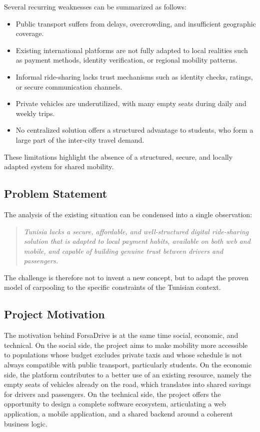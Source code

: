Several recurring weaknesses can be summarized as follows:

\begin{itemize}[noitemsep]
    \item Public transport suffers from delays, overcrowding, and insufficient geographic coverage.
    \item Existing international platforms are not fully adapted to local realities such as payment methods, identity verification, or regional mobility patterns.
    \item Informal ride-sharing lacks trust mechanisms such as identity checks, ratings, or secure communication channels.
    \item Private vehicles are underutilized, with many empty seats during daily and weekly trips.
    \item No centralized solution offers a structured advantage to students, who form a large part of the inter-city travel demand.
\end{itemize}

These limitations highlight the absence of a structured, secure, and locally adapted system for shared mobility.

\subsection{Problem Statement}

The analysis of the existing situation can be condensed into a single observation:

\begin{quote}
\textit{Tunisia lacks a secure, affordable, and well-structured digital ride-sharing solution that is adapted to local payment habits, available on both web and mobile, and capable of building genuine trust between drivers and passengers.}
\end{quote}

The challenge is therefore not to invent a new concept, but to adapt the proven model of carpooling to the specific constraints of the Tunisian context.

\subsection{Project Motivation}

The motivation behind ForsaDrive is at the same time social, economic, and technical. On the social side, the project aims to make mobility more accessible to populations whose budget excludes private taxis and whose schedule is not always compatible with public transport, particularly students. On the economic side, the platform contributes to a better use of an existing resource, namely the empty seats of vehicles already on the road, which translates into shared savings for drivers and passengers. On the technical side, the project offers the opportunity to design a complete software ecosystem, articulating a web application, a mobile application, and a shared backend around a coherent business logic.

